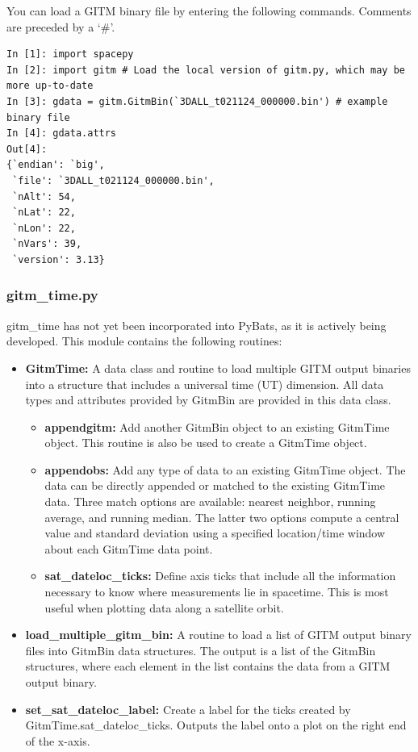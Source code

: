 You can load a GITM binary file by entering the following commands.  Comments are preceded by a `\#'.

\begin{verbatim}
In [1]: import spacepy
In [2]: import gitm # Load the local version of gitm.py, which may be more up-to-date
In [3]: gdata = gitm.GitmBin(`3DALL_t021124_000000.bin') # example binary file
In [4]: gdata.attrs
Out[4]:
{`endian': `big',
 `file': `3DALL_t021124_000000.bin',
 `nAlt': 54,
 `nLat': 22,
 `nLon': 22,
 `nVars': 39,
 `version': 3.13}
\end{verbatim}

\subsubsection{gitm\_time.py}

gitm\_time has not yet been incorporated into PyBats, as it is actively being developed.   This module contains the following routines:

\begin{itemize}
\item[]{\bf GitmTime: } A data class and routine to load multiple GITM output binaries into a structure that includes a universal time (UT) dimension.  All data types and attributes provided by GitmBin are provided in this data class.
	\begin{itemize}
	\item[]{\bf appendgitm: } Add another GitmBin object to an existing GitmTime object.  This routine is also be used to create a GitmTime object.
	\item[]{\bf appendobs: } Add any type of data to an existing GitmTime object.  The data can be directly appended or matched to the existing GitmTime data.  Three match options are available: nearest neighbor, running average, and running median.  The latter two options compute a central value and standard deviation using a specified location/time window about each GitmTime data point.
	\item[]{\bf sat\_dateloc\_ticks: } Define axis ticks that include all the information necessary to know where measurements lie in spacetime.  This is most useful when plotting data along a satellite orbit.
	\end{itemize}
\item[]{\bf load\_multiple\_gitm\_bin: } A routine to load a list of GITM output binary files into GitmBin data structures.  The output is a list of the GitmBin structures, where each element in the list contains the data from a GITM output binary.
\item[]{\bf set\_sat\_dateloc\_label: } Create a label for the ticks created by GitmTime.sat\_dateloc\_ticks.  Outputs the label onto a plot on the right end of the x-axis.
\end{itemize}

